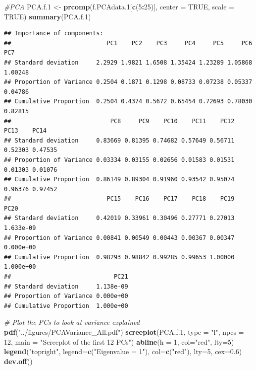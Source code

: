 \documentclass[
]{article}
\newenvironment{Shaded}{\begin{snugshade}}{\end{snugshade}}
\newcommand{\AttributeTok}[1]{\textcolor[rgb]{0.13,0.29,0.53}{#1}}
\newcommand{\CommentTok}[1]{\textcolor[rgb]{0.56,0.35,0.01}{\textit{#1}}}
\newcommand{\ConstantTok}[1]{\textcolor[rgb]{0.56,0.35,0.01}{#1}}
\newcommand{\DecValTok}[1]{\textcolor[rgb]{0.00,0.00,0.81}{#1}}
\newcommand{\FloatTok}[1]{\textcolor[rgb]{0.00,0.00,0.81}{#1}}
\newcommand{\FunctionTok}[1]{\textcolor[rgb]{0.13,0.29,0.53}{\textbf{#1}}}
\newcommand{\NormalTok}[1]{#1}
\newcommand{\OtherTok}[1]{\textcolor[rgb]{0.56,0.35,0.01}{#1}}
\newcommand{\SpecialCharTok}[1]{\textcolor[rgb]{0.81,0.36,0.00}{\textbf{#1}}}
\newcommand{\StringTok}[1]{\textcolor[rgb]{0.31,0.60,0.02}{#1}}
\begin{document}
\begin{Shaded}
\begin{Highlighting}[]
\CommentTok{\#PCA}
\NormalTok{PCA.f}\FloatTok{.1} \OtherTok{\textless{}{-}} \FunctionTok{prcomp}\NormalTok{(f.PCAdata}\FloatTok{.1}\NormalTok{[}\FunctionTok{c}\NormalTok{(}\DecValTok{5}\SpecialCharTok{:}\DecValTok{25}\NormalTok{)], }\AttributeTok{center =} \ConstantTok{TRUE}\NormalTok{, }\AttributeTok{scale =} \ConstantTok{TRUE}\NormalTok{)}
\FunctionTok{summary}\NormalTok{(PCA.f}\FloatTok{.1}\NormalTok{)}
\end{Highlighting}
\end{Shaded}

\begin{verbatim}
## Importance of components:
##                           PC1    PC2    PC3     PC4     PC5     PC6     PC7
## Standard deviation     2.2929 1.9821 1.6508 1.35424 1.23289 1.05868 1.00248
## Proportion of Variance 0.2504 0.1871 0.1298 0.08733 0.07238 0.05337 0.04786
## Cumulative Proportion  0.2504 0.4374 0.5672 0.65454 0.72693 0.78030 0.82815
##                            PC8     PC9    PC10    PC11    PC12    PC13    PC14
## Standard deviation     0.83669 0.81395 0.74682 0.57649 0.56711 0.52303 0.47535
## Proportion of Variance 0.03334 0.03155 0.02656 0.01583 0.01531 0.01303 0.01076
## Cumulative Proportion  0.86149 0.89304 0.91960 0.93542 0.95074 0.96376 0.97452
##                           PC15    PC16    PC17    PC18    PC19      PC20
## Standard deviation     0.42019 0.33961 0.30496 0.27771 0.27013 1.633e-09
## Proportion of Variance 0.00841 0.00549 0.00443 0.00367 0.00347 0.000e+00
## Cumulative Proportion  0.98293 0.98842 0.99285 0.99653 1.00000 1.000e+00
##                             PC21
## Standard deviation     1.138e-09
## Proportion of Variance 0.000e+00
## Cumulative Proportion  1.000e+00
\end{verbatim}

\begin{Shaded}
\begin{Highlighting}[]
\CommentTok{\# Plot the PCs to look at variance explained}
\FunctionTok{pdf}\NormalTok{(}\StringTok{"../figures/PCAVariance\_All.pdf"}\NormalTok{)}
\FunctionTok{screeplot}\NormalTok{(PCA.f}\FloatTok{.1}\NormalTok{, }\AttributeTok{type =} \StringTok{"l"}\NormalTok{, }\AttributeTok{npcs =} \DecValTok{12}\NormalTok{, }\AttributeTok{main =} \StringTok{"Screeplot of the first 12 PCs"}\NormalTok{)}
\FunctionTok{abline}\NormalTok{(}\AttributeTok{h =} \DecValTok{1}\NormalTok{, }\AttributeTok{col=}\StringTok{"red"}\NormalTok{, }\AttributeTok{lty=}\DecValTok{5}\NormalTok{)}
\FunctionTok{legend}\NormalTok{(}\StringTok{"topright"}\NormalTok{, }\AttributeTok{legend=}\FunctionTok{c}\NormalTok{(}\StringTok{"Eigenvalue = 1"}\NormalTok{),}
       \AttributeTok{col=}\FunctionTok{c}\NormalTok{(}\StringTok{"red"}\NormalTok{), }\AttributeTok{lty=}\DecValTok{5}\NormalTok{, }\AttributeTok{cex=}\FloatTok{0.6}\NormalTok{)}
\FunctionTok{dev.off}\NormalTok{()}
\end{Highlighting}
\end{Shaded}
\end{document}
